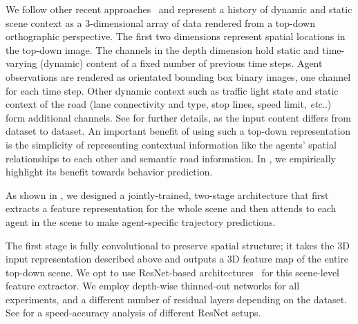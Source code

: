 \documentclass{article}
\makeatletter
\DeclareRobustCommand\onedot{\futurelet\@let@token\@onedot}
\def\@onedot{\ifx\@let@token.\else.\null\fi\xspace}
\def\etc{\emph{etc}\onedot} \def\vs{\emph{vs}\onedot}
\newcommand{\supsecref}[1]{\secref{#1}}
\makeatother
\begin{document}
We follow other recent approaches~\cite{Casas18, Hong19, Bansal19} and represent a history of dynamic and static scene context as a 3-dimensional array of data rendered from a top-down orthographic perspective. The first two dimensions represent spatial locations in the top-down image. The channels in the depth dimension hold static and time-varying (dynamic) content of a fixed number of previous time steps. Agent observations are rendered as orientated bounding box binary images, one channel for each time step. Other dynamic context such as traffic light state and static context of the road (lane connectivity and type, stop lines, speed limit, \etc) form additional channels. See  for further details, as the input content differs from dataset to dataset. An important benefit of using such a top-down representation is the simplicity of representing contextual information like the agents' spatial relationships to each other and semantic road information. In \supsecref{sec:roadgraph}, we empirically highlight its benefit towards behavior prediction.

As shown in , we designed a jointly-trained, two-stage architecture that first extracts a feature representation for the whole scene and then attends to each agent in the scene to make agent-specific trajectory predictions. 

The first stage is fully convolutional to preserve spatial structure; it takes the 3D input representation described above and outputs a 3D feature map of the entire top-down scene. We opt to use ResNet-based architectures~\cite{He16} for this scene-level feature extractor. We employ depth-wise thinned-out networks for all experiments, and a different number of residual layers depending on the dataset. See \supsecref{sec:backbone} for a speed-accuracy analysis of different ResNet setups.
\end{document}
